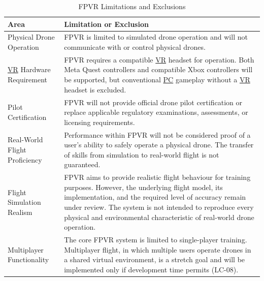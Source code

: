 \documentclass[12pt]{article}
\begin{document}
\newpage
\begin{table}[htbp]
\centering
\small
\caption{FPVR Limitations and Exclusions}
\label{tab:limitations-exclusions}

\begin{tabularx}{\textwidth}{
    @{}p{4cm} X@{}
}
\toprule
\textbf{Area} &
\textbf{Limitation or Exclusion} \\
\midrule

Physical Drone Operation &
FPVR is limited to simulated drone operation and will not
communicate with or control physical drones. \\

\addlinespace

\hyperlink{glos:VR}{VR} Hardware Requirement &
FPVR requires a compatible \hyperlink{glos:VR}{VR} headset for operation.
Both Meta Quest controllers and compatible Xbox controllers
will be supported, but conventional \hyperlink{glos:PCVR}{PC} gameplay without
a \hyperlink{glos:VR}{VR} headset is excluded. \\

\addlinespace

Pilot Certification &
FPVR will not provide official drone pilot certification
or replace applicable regulatory examinations, assessments,
or licensing requirements. \\

\addlinespace

Real-World Flight Proficiency &
Performance within FPVR will not be considered proof
of a user's ability to safely operate a physical drone.
The transfer of skills from simulation to real-world
flight is not guaranteed. \\

\addlinespace

Flight Simulation Realism &
FPVR aims to provide realistic flight behaviour for
training purposes. However, the underlying flight model,
its implementation, and the required level of accuracy
remain under review. The system is not intended to
reproduce every physical and environmental characteristic
of real-world drone operation. \\

\addlinespace

Multiplayer Functionality &
The core FPVR system is limited to single-player training.
Multiplayer flight, in which multiple users operate drones
in a shared virtual environment, is a stretch goal and
will be implemented only if development time permits (LC-08). \\


\end{tabularx}
\end{table}
\end{document}
